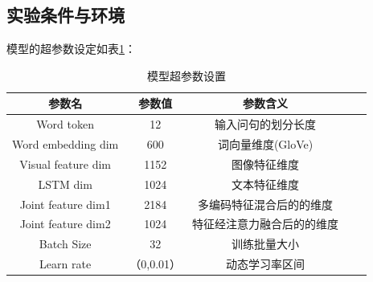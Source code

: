 
\subsection{实验条件与环境}
模型的超参数设定如表\ref{tab:su_para}：
\begin{table}
	\centering
	\caption{\label{tab:su_para}模型超参数设置}
	\small
	\begin{tabular}{ccccc}
		\hline
		参数名 & 参数值 & 参数含义 \\
		\hline Word token & 12 & 输入问句的划分长度 \\
		Word embedding dim & 600 & 词向量维度(GloVe) \\
		Visual feature dim & 1152 & 图像特征维度 \\
		LSTM dim & 1024 & 文本特征维度 \\
		Joint feature dim1 & 2184 & 多编码特征混合后的的维度 \\
		Joint feature dim2 & 1024 & 特征经注意力融合后的的维度 \\
		Batch Size & 32 & 训练批量大小 \\
		Learn rate & （0,0.01） & 动态学习率区间 \\
		\hline
	\end{tabular}
\end{table}

